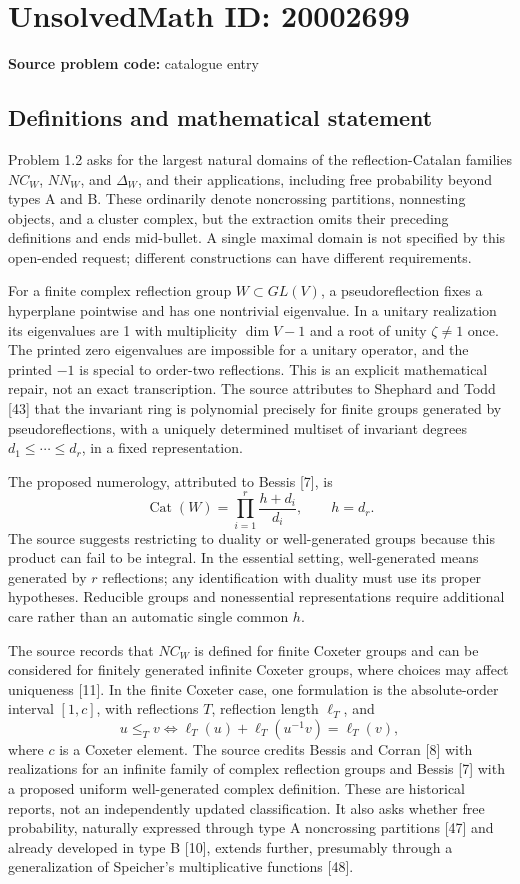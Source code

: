 \documentclass[11pt]{article}
\begin{document}
\section*{UnsolvedMath ID: 20002699}
\textbf{Source problem code:} catalogue entry
\subsection{Definitions and mathematical statement}
Problem 1.2 asks for the largest natural domains of the reflection-Catalan families \(NC_W\), \(NN_W\), and \(\Delta_W\), and their applications, including free probability beyond types A and B. These ordinarily denote noncrossing partitions, nonnesting objects, and a cluster complex, but the extraction omits their preceding definitions and ends mid-bullet. A single maximal domain is not specified by this open-ended request; different constructions can have different requirements.

For a finite complex reflection group \(W\subset GL(V)\), a pseudoreflection fixes a hyperplane pointwise and has one nontrivial eigenvalue. In a unitary realization its eigenvalues are 1 with multiplicity \(\dim V-1\) and a root of unity \(\zeta\ne1\) once. The printed zero eigenvalues are impossible for a unitary operator, and the printed \(-1\) is special to order-two reflections. This is an explicit mathematical repair, not an exact transcription. The source attributes to Shephard and Todd [43] that the invariant ring is polynomial precisely for finite groups generated by pseudoreflections, with a uniquely determined multiset of invariant degrees \(d_1\le\cdots\le d_r\), in a fixed representation.

The proposed numerology, attributed to Bessis [7], is
\[
 \operatorname{Cat}(W)=\prod_{i=1}^r\frac{h+d_i}{d_i},\qquad h=d_r.
\]
The source suggests restricting to duality or well-generated groups because this product can fail to be integral. In the essential setting, well-generated means generated by \(r\) reflections; any identification with duality must use its proper hypotheses. Reducible groups and nonessential representations require additional care rather than an automatic single common \(h\).

The source records that \(NC_W\) is defined for finite Coxeter groups and can be considered for finitely generated infinite Coxeter groups, where choices may affect uniqueness [11]. In the finite Coxeter case, one formulation is the absolute-order interval \([1,c]\), with reflections \(T\), reflection length \(\ell_T\), and
\[
 u\le_Tv\iff\ell_T(u)+\ell_T(u^{-1}v)=\ell_T(v),
\]
where \(c\) is a Coxeter element. The source credits Bessis and Corran [8] with realizations for an infinite family of complex reflection groups and Bessis [7] with a proposed uniform well-generated complex definition. These are historical reports, not an independently updated classification. It also asks whether free probability, naturally expressed through type A noncrossing partitions [47] and already developed in type B [10], extends further, presumably through a generalization of Speicher's multiplicative functions [48].
\end{document}
